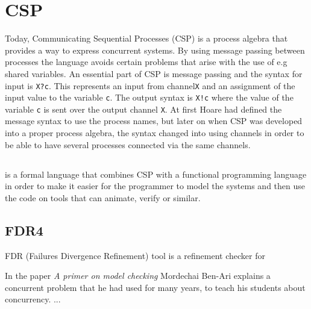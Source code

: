 \section{CSP}
Today, Communicating Sequential Processes (CSP)  is a process algebra that provides a way to express concurrent systems. By using message passing between processes the language avoids certain problems that arise with the use of e.g shared variables. An essential part of CSP is message passing and the syntax for input is \texttt{X?c}. This represents an input from channel\texttt{X} and an assignment of the input value to the variable \texttt{c}. The output syntax is \texttt{X!c} where the value of the variable \texttt{c} is sent over the output channel \texttt{X}. At first Hoare had defined the message syntax to use the process names, but later on when CSP was developed into a proper process algebra, the syntax changed into using channels in order to be able to have several processes connected via the same channels. %

\subsection{\cspm{}}
\cspm{} is a formal language that combines CSP with a functional programming language in order to make it easier for the programmer to model the systems and then use the code on tools that can animate, verify or similar.


\subsection{FDR4}
FDR (Failures Divergence Refinement) tool is a refinement checker for

In the paper \textit{A primer on model checking}\cite{Ben-ari2010} Mordechai Ben-Ari explains a concurrent problem that he had used for many years, to teach his students about concurrency. ... %


